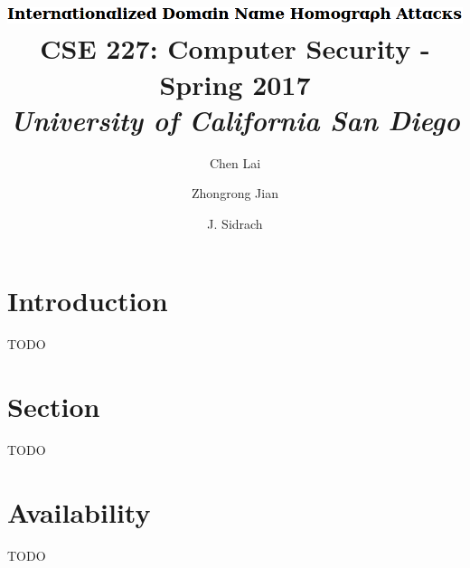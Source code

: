\documentclass[letterpaper,twocolumn,10pt]{article}
\begin{document}
\date{}

\title{\Large
\includegraphics[height=\baselineskip]{title}
\\ \vspace{0.025 in} \large \normalfont
CSE 227: Computer Security - Spring 2017 \\ \textit{
University of California San Diego
}}

\author{
{\rm Chen Lai}\\
\and
{\rm Zhongrong Jian}\\
\and
{\rm J. Sidrach}\\
}

\maketitle


\section{Introduction}
TODO

\section{Section}
TODO

\section{Availability}
TODO~\cite{ipv4sta}

{\footnotesize 
}

\theendnotes
\end{document}
